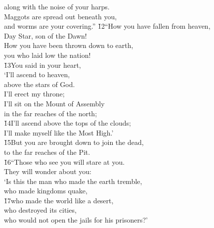 \begin{poetry}
\poemll    along with the noise of your harps. \\
\poeml Maggots are spread out beneath you, \\
\poemll    and worms are your covering.''
\poeml \v{12}``How you have fallen from heaven, \\
\poemll    Day Star, son of the Dawn! \\
\poeml How you have been thrown down to earth, \\
\poemll    you who laid low the nation! \\
\poeml \v{13}You said in your heart, \\
\poemll    `I'll ascend to heaven, \\
\poemlll       above the stars of God. \\
\poeml I'll erect my throne; \\
\poemll    I'll sit on the Mount of Assembly \\
\poemlll       in the far reaches of the north; \\
\poeml \v{14}I'll ascend above the tops of the clouds; \\
\poemll    I'll make myself like the Most High.' \\
\poeml \v{15}But you are brought down to join the dead, \\
\poemll    to the far reaches of the Pit. \\
\poeml \v{16}``Those who see you will stare at you. \\
\poemll    They will wonder about you: \\
\poeml `Is this the man who made the earth tremble, \\
\poemll    who made kingdoms quake, \\
\poeml \v{17}who made the world like a desert, \\
\poemll    who destroyed its cities, \\
\poemlll       who would not open the jails for his prisoners?' \\

\end{poetry}
